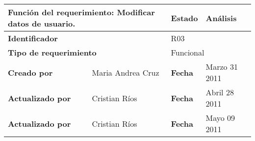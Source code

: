 %
\begin{center}
\begin{longtable}{|p{}|p{}|p{}|p{}|}
\hline
\multicolumn{2}{|p{0.45\textwidth}|}{{\bf {Función del requerimiento:}}
Modificar datos de usuario. } & {\bf{ Estado}} & Análisis \\
\hline
\multicolumn{2}{|p{0.45\textwidth}}{\bf Identificador} &
\multicolumn{2}{|p{0.45\textwidth}|}{R03} \\
\hline
\multicolumn{2}{|p{0.45\textwidth}}{\bf {Tipo de requerimiento}} &
\multicolumn{2}{|p{0.45\textwidth}|}{Funcional}\\
\hline
\bf {Creado por} & Maria Andrea Cruz & \bf {Fecha } & Marzo 31 2011\\
\hline
\bf {Actualizado por} &  Cristian Ríos & \bf {Fecha  }& Abril 28 2011\\
\hline
\bf {Actualizado por} &  Cristian Ríos & \bf {Fecha  }& Mayo 09 2011\\



\end{longtable}
\end{center}
